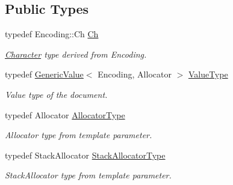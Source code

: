 \subsection*{Public Types}
\begin{DoxyCompactItemize}
\item 
typedef Encoding\+::\+Ch \hyperlink{classGenericDocument_a6f5b0b7b6626508d094ae67490269700}{Ch}
\begin{DoxyCompactList}\small\item\em \hyperlink{structCharacter}{Character} type derived from Encoding. \end{DoxyCompactList}\item 
typedef \hyperlink{classGenericValue}{Generic\+Value}$<$ Encoding, Allocator $>$ \hyperlink{classGenericDocument_a8936205dc215dda029060d7e835e0549}{Value\+Type}
\begin{DoxyCompactList}\small\item\em Value type of the document. \end{DoxyCompactList}\item 
typedef Allocator \hyperlink{classGenericDocument_a35155b912da66ced38d22e2551364c57}{Allocator\+Type}
\begin{DoxyCompactList}\small\item\em Allocator type from template parameter. \end{DoxyCompactList}\item 
typedef Stack\+Allocator \hyperlink{classGenericDocument_a4765969f2292442eef42b28388e1f75b}{Stack\+Allocator\+Type}
\begin{DoxyCompactList}\small\item\em Stack\+Allocator type from template parameter. \end{DoxyCompactList}\end{DoxyCompactItemize}

